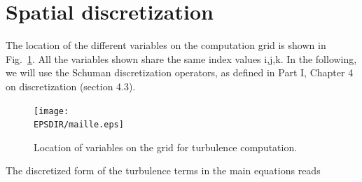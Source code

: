 \section{Spatial discretization}
The location of the different variables on the computation grid is shown in
Fig.~\ref{maille}. All the variables shown share the same index values i,j,k.
In the following, we will use the Schuman discretization operators, as defined
in Part I, Chapter 4 on discretization (section 4.3).

\begin{figure}[!ht]
\centerline{\texttt{[image: \\EPSDIR/maille.eps]}}
\caption{Location of variables on the grid for turbulence computation.}
\label{maille}
\end{figure}

The discretized form of the turbulence terms in the main equations reads

